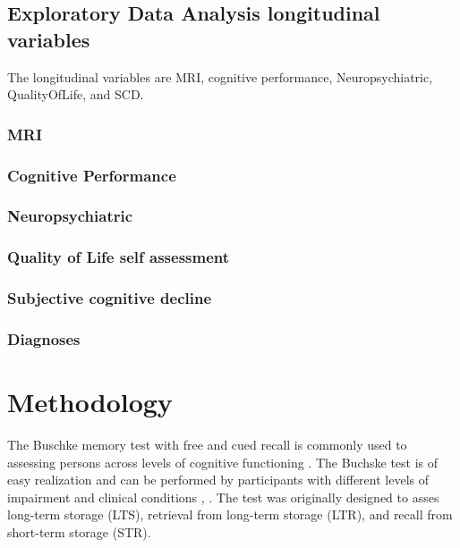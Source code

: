 \documentclass[11pt]{article}
\theoremstyle{definition}
\theoremstyle{remark}
\begin{document}
\subsection{Exploratory Data Analysis longitudinal variables}
\label{se:eda_long}
The longitudinal variables are MRI, cognitive performance, Neuropsychiatric, QualityOfLife, and SCD.
\subsubsection{MRI}
\label{sse:mri}


\subsubsection{Cognitive Performance}
\label{sse:cogper}

\subsubsection{Neuropsychiatric}
\label{sse:neupsy}

\subsubsection{Quality of Life self assessment}
\label{sse:qol}

\subsubsection{Subjective cognitive decline}
\label{sse:scd}

\subsubsection{Diagnoses}
\label{sse:diag}


\section{Methodology}
\label{se:met}
The Buschke memory test with free and cued recall is commonly used to assessing persons across levels of cognitive functioning \cite{buschke1973selective}. The Buchske test is of easy realization and can be performed by participants with different levels of impairment and clinical conditions \cite{o200212}, \cite{leitner2017comparison}. The test was originally  designed to asses long-term storage (LTS), retrieval from long-term storage (LTR), and recall from short-term storage (STR).
\end{document}
